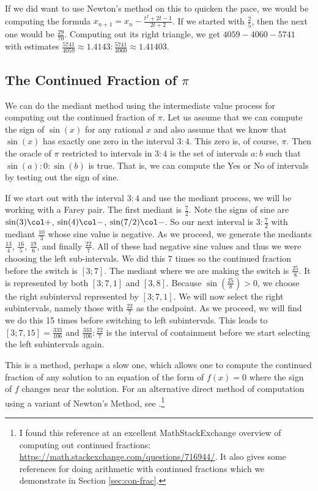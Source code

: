 \documentclass[12pt]{article}
\begin{document}
If we did want to use Newton's method on this to quicken the pace, we would be computing the formula $x_{n+1} = x_n - \frac{ t^2  + 2t -1}{2t + 2}$. If we started with $\frac{2}{5}$, then the next one would be $\frac{29}{70}$. Computing out its right triangle, we get $4059-4060-5741$ with estimates $\frac{5741}{4059}\approx 1.4143: \frac{5741}{4060} \approx 1.41403$. 

\subsection{The Continued Fraction of \texorpdfstring{$\pi$}{pi}}

We can do the mediant method using the intermediate value process for computing out the continued fraction of $\pi$. Let us assume that we can compute the sign of $\sin(x)$ for any rational $x$ and also assume that we know that $\sin(x)$ has exactly one zero in the interval $3:4$. This zero is, of course, $\pi$. Then the oracle of $\pi$ restricted to intervals in $3:4$ is the set of intervals $a:b$ such that $\sin(a):0:\sin(b)$ is true. That is, we can compute the Yes or No of intervals by testing out the sign of sine. 

If we start out with the interval  $3:4$ and use the mediant process, we will be working with a Farey pair. The first mediant is $\frac{7}{2}$. Note the signs of sine are  $\sin(3) \col +$, $\sin(4) \col -$, $\sin(7/2) \col -$. So our next interval is $3:\frac{7}{2}$ with mediant $\frac{10}{3}$ whose sine value is negative. As we proceed, we generate the mediants $\frac{13}{4}$, $\frac{16}{5}$, $\frac{19}{6}$, and finally $\frac{22}{7}$. All of these had negative sine values and thus we were choosing the left sub-intervals. We did this 7 times so the continued fraction before the switch is $[3;7]$. The mediant where we are making the switch is $\frac{25}{8}$. It is represented by both $[3; 7, 1]$ and $[3, 8]$.  Because $\sin(\frac{25}{8}) > 0$, we choose the right subinterval represented by $[3; 7, 1]$. We will now select the right subintervals, namely those with $\frac{22}{7}$ as the endpoint. As we proceed, we will find we do this 15 times before switching to left subintervals. This leads to $[3; 7, 15] = \frac{333}{106}$ and $\frac{333}{106}:\frac{22}{7}$ is the interval of containment before we start selecting the left subintervals again.

This is a method, perhaps a slow one, which allows one to compute the continued fraction of any solution to an equation of the form of $f(x) =0$ where the sign of $f$ changes near the solution. For an alternative direct method of computation using a variant of Newton's Method, see \cite{shiu95}.\footnote{I found this reference at an excellent MathStackExchange overview of computing out continued fractions: \url{https://math.stackexchange.com/questions/716944/}.  It also gives some references for doing arithmetic with continued fractions which we demonstrate in Section \ref{sec:con-frac}.} 
\end{document}
